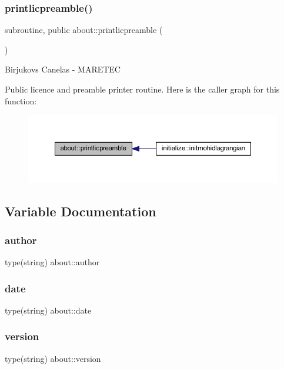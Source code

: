 \subsubsection{\texorpdfstring{printlicpreamble()}{printlicpreamble()}}
{\footnotesize\ttfamily subroutine, public about\+::printlicpreamble (\begin{DoxyParamCaption}{ }\end{DoxyParamCaption})}



Birjukovs Canelas -\/ M\+A\+R\+E\+T\+EC 

Public licence and preamble printer routine. Here is the caller graph for this function\+:
\nopagebreak
\begin{figure}[H]
\begin{center}
\leavevmode
\includegraphics[width=350pt]{namespaceabout_aca93132913ea2de3a9eb9aa3d1c0ec9c_icgraph}
\end{center}
\end{figure}


\subsection{Variable Documentation}
\mbox{\label{namespaceabout_a157e082adf984f1d88804d2f8217a632}} 
\subsubsection{\texorpdfstring{author}{author}}
{\footnotesize\ttfamily type(string) about\+::author\hspace{0.3cm}{\ttfamily [private]}}

\mbox{\label{namespaceabout_a24578effbdb161e41c0b52f50e7e3ffc}} 
\subsubsection{\texorpdfstring{date}{date}}
{\footnotesize\ttfamily type(string) about\+::date\hspace{0.3cm}{\ttfamily [private]}}

\mbox{\label{namespaceabout_a14ee014ae64ebcd65e04112f51ca7911}} 
\subsubsection{\texorpdfstring{version}{version}}
{\footnotesize\ttfamily type(string) about\+::version\hspace{0.3cm}{\ttfamily [private]}}

